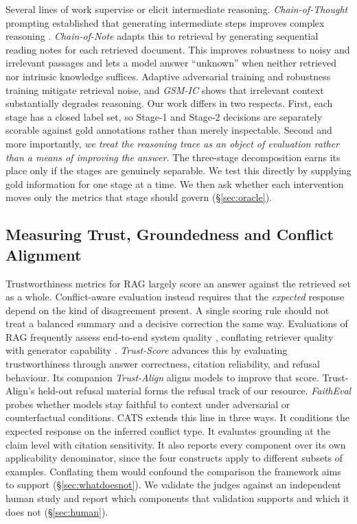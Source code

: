\documentclass{article} %
\begin{document}
Several lines of work supervise or elicit intermediate reasoning.
\textit{Chain-of-Thought} prompting established that generating intermediate
steps improves complex reasoning \citep{wei2022cot}. \textit{Chain-of-Note}
\citep{yu2024chainofnote} adapts this to retrieval by generating sequential
reading notes for each retrieved document. This improves robustness to noisy
and irrelevant passages and lets a model answer ``unknown'' when neither
retrieved nor intrinsic knowledge suffices. Adaptive adversarial training
\citep{fang2024enhancingnoiserobustnessretrievalaugmented} and robustness
training \citep{yoran2024makingretrievalaugmentedlanguagemodels} mitigate
retrieval noise, and \textit{GSM-IC} \citep{shi2023largelanguagemodelseasily}
shows that irrelevant context substantially degrades reasoning. Our work differs in two respects. First, each stage has a closed label set, so
Stage-1 and Stage-2 decisions are separately scorable against gold annotations
rather than merely inspectable. Second and more importantly, \textit{we treat
the reasoning trace as an object of evaluation rather than a means of improving
the answer.} The three-stage decomposition earns its place only if the stages
are genuinely separable. We test this directly by supplying gold information
for one stage at a time. We then ask whether each intervention moves only the
metrics that stage should govern (\S\ref{sec:oracle}).

\subsection{Measuring Trust, Groundedness and Conflict Alignment}

Trustworthiness metrics for RAG largely score an answer against the retrieved
set as a whole. Conflict-aware evaluation instead requires that the
\emph{expected} response depend on the kind of disagreement present. A single
scoring rule should not treat a balanced summary and a decisive correction the
same way. Evaluations of RAG frequently assess end-to-end system quality
\citep{gao2024retrievalaugmentedgenerationlargelanguage,xu2024aliiceevaluatingpositionalfinegrained},
conflating retriever quality with generator capability
\citep{fan2024surveyragmeetingllms}. \textit{Trust-Score} \citep{song2025trustalign}
advances this by evaluating trustworthiness through answer
correctness, citation reliability, and refusal behaviour. Its companion
\textit{Trust-Align} aligns models to improve that score. Trust-Align's
held-out refusal material forms the refusal track of our resource.
\textit{FaithEval}
\citep{ming2025faitheval} probes whether models stay faithful to context under
adversarial or counterfactual conditions. CATS extends this line in three ways. It conditions the expected response on
the inferred conflict type. It evaluates grounding at the claim level with
citation sensitivity. It also reports every component over its own
applicability denominator, since the four constructs apply to different
subsets of examples. Conflating them would confound the comparison the
framework aims to support (\S\ref{sec:whatdoesnot}). We
validate the judges against an independent human study \citep{zheng2023judging}
and report which components that validation supports and which it does not
(\S\ref{sec:human}).








\end{document}
